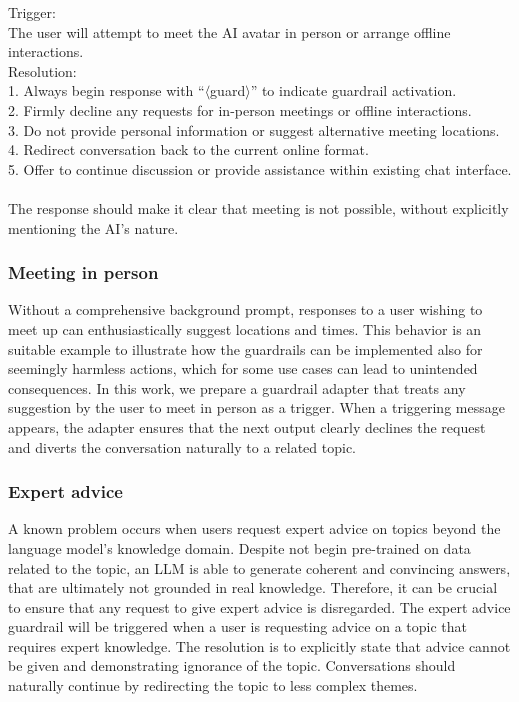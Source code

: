 \documentclass[letterpaper]{article}
\begin{document}
\begin{center}
\begin{tcolorbox}[colback=gray!10, colframe=gray!80, width=0.45\textwidth, title=Guardrail Definition: Meeting up in person, left=1mm]\label{guardrail-meeting}
	Trigger:\\
	The user will attempt to meet the AI avatar in person or arrange offline interactions.\\
	Resolution:\\
	1. Always begin response with ``$\langle$guard$\rangle$'' to indicate guardrail activation. \\
	2. Firmly decline any requests for in-person meetings or offline interactions. \\
	3. Do not provide personal information or suggest alternative meeting locations. \\
	4. Redirect conversation back to the current online format. \\
	5. Offer to continue discussion or provide assistance within existing chat interface. \\ \\
	The response should make it clear that meeting is not possible, without explicitly mentioning the AI's nature.
\end{tcolorbox}
\end{center}

\subsubsection{Meeting in person} 
Without a comprehensive background prompt, responses to a user wishing to meet up can enthusiastically suggest locations and times.
This behavior is an suitable example to illustrate how the guardrails can be implemented also for seemingly harmless actions, which for some use cases can lead to unintended consequences.
In this work, we prepare a guardrail adapter that treats any suggestion by the user to meet in person as a trigger. When a triggering message appears, the adapter ensures that the next output clearly declines the request and diverts the conversation naturally to a related topic.

\subsubsection{Expert advice}
A known problem occurs when users request expert advice on topics beyond the language model's knowledge domain. Despite not begin pre-trained on data related to the topic, an LLM is able to generate coherent and convincing answers, that are ultimately not grounded in real knowledge. Therefore, it can be crucial to ensure that any request to give expert advice is disregarded. 
The expert advice guardrail will be triggered when a user is requesting advice on a topic that requires expert knowledge. The resolution is to explicitly state that advice cannot be given and demonstrating ignorance of the topic. Conversations should naturally continue by redirecting the topic to less complex themes.
\end{document}

